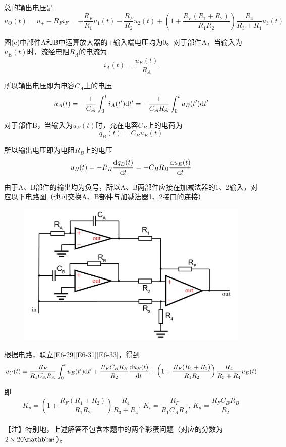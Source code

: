 \documentclass[10pt,a4paper,onecolumn,UTF8]{ctexart}
\begin{document}
	总的输出电压是
	\begin{equation}\label{E6-29}
		u_O(t)=u_+-R_Fi_F=-\frac{R_F}{R_1}u_1(t)-\frac{R_F}{R_2}u_2(t)+\left(1+\frac{R_F(R_1+R_2)}{R_1R_2}\right)\frac{R_4}{R_3+R_4}u_3(t)
	\end{equation}
	
	图(e)中部件A和B中运算放大器的$+$输入端电压均为0。对于部件A，当输入为$u_E(t)$时，流经电阻$R_A$的电流为
	\begin{equation}
		i_A(t)=\frac{u_E(t)}{R_A}
	\end{equation}
	
	所以输出电压即为电容$C_A$上的电压
	\begin{equation}\label{E6-31}
		u_A(t)=-\frac{1}{C_A}\int_0^t i_A(t')\mathrm{d} t'=-\frac{1}{C_AR_A}\int_0^t u_E(t')\mathrm{d} t'
	\end{equation}
	
	对于部件B，当输入为$u_E(t)$时，充在电容$C_B$上的电荷为
	\begin{equation}
		q_B(t)=C_Bu_E(t)
	\end{equation}
	
	所以输出电压即为电阻$R_B$上的电压
	\begin{equation}\label{E6-33}
		u_B(t)=-R_B\frac{\mathrm{d} q_B(t)}{\mathrm{d} t}=-C_BR_B\frac{\mathrm{d} u_E(t)}{\mathrm{d} t}
	\end{equation}
	
	由于A、B部件的输出均为负号，所以A、B两部件应接在加减法器的1、2输入，对应以下电路图（也可交换A、B部件与加减法器1、2接口的连接）
	
	\begin{figure}[!tb]
		\centering
		\includegraphics[width=0.7\columnwidth]{FB.png}
	\end{figure}
	
	根据电路，联立\eqref{E6-29}\eqref{E6-31}\eqref{E6-33}，得到
	\begin{equation}
		u_U(t)=\frac{R_F}{R_1C_AR_A}\int_0^t u_E(t')\mathrm{d} t'+\frac{R_FC_BR_B}{R_2}\frac{\mathrm{d} u_E(t)}{\mathrm{d} t}+\left(1+\frac{R_F(R_1+R_2)}{R_1R_2}\right)\frac{R_4}{R_3+R_4}u_E(t)
	\end{equation}
	
	即
	\begin{equation}
		K_p=\left(1+\frac{R_F(R_1+R_2)}{R_1R_2}\right)\frac{R_4}{R_3+R_4},\,K_i=\frac{R_F}{R_1C_AR_A},\,K_d=\frac{R_FC_BR_B}{R_2}
	\end{equation}\\
	
	【注】特别地，上述解答不包含本题中的两个彩蛋问题（对应的分数为$2\times20\ui$）。
	
	
	
	
	
	
	
	
	
	
	
	
\end{document}
